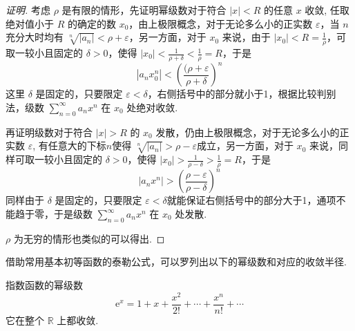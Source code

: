 \begin{proof}[证明]
  考虑 $\rho$ 是有限的情形，先证明幂级数对于符合 $|x|<R$ 的任意 $x$ 收敛, 任取绝对值小于 $R$ 的确定的数 $x_0$，由上极限概念，对于无论多么小的正实数 $\varepsilon$，当 $n$ 充分大时均有 $\sqrt[n]{|a_n|}<\rho+\varepsilon$，另一方面，对于 $x_0$ 来说，由于 $|x_0|<R=\frac{1}{\rho}$，可取一较小且固定的 $\delta>0$，使得 $|x_0|<\frac{1}{\rho + \delta}<\frac{1}{\rho}=R$，于是
  \[ |a_nx_0^n| < \left( \frac{(\rho+\varepsilon}{\rho+\delta} \right)^n \]
  这里 $\delta$ 是固定的，只要限定 $\varepsilon<\delta$，右侧括号中的部分就小于1，根据比较判别法，级数 $\sum_{n=0}^{\infty}a_nx^n$ 在 $x_0$ 处绝对收敛.

  再证明级数对于符合 $|x|>R$ 的 $x_0$ 发散，仍由上极限概念，对于无论多么小的正实数 $\varepsilon$, 有任意大的下标$n$使得 $\sqrt[n]{|a_n|}>\rho-\varepsilon$成立，另一方面，对于 $x_0$ 来说，同样可取一较小且固定的 $\delta>0$，使得 $|x_0|>\frac{1}{\rho-\delta}>\frac{1}{\rho}=R$，于是
  \[ |a_nx^n| > \left( \frac{\rho-\varepsilon}{\rho-\delta} \right)^n \] 
  同样由于 $\delta$ 是固定的，只要限定 $\varepsilon<\delta$就能保证右侧括号中的部分大于1，通项不能趋于零，于是级数  $\sum_{n=0}^{\infty}a_nx^n$ 在 $x_0$ 处发散.

  $\rho$ 为无穷的情形也类似的可以得出.
\end{proof}

\begin{example}
  借助常用基本初等函数的泰勒公式，可以罗列出以下的幂级数和对应的收敛半径.

  指数函数的幂级数
  \[ \mathrm{e}^x = 1 + x + \frac{x^2}{2!}+\cdots+\frac{x^n}{n!}+\cdots \]
  它在整个 $\mathbb{R}$ 上都收敛.
\end{example}

